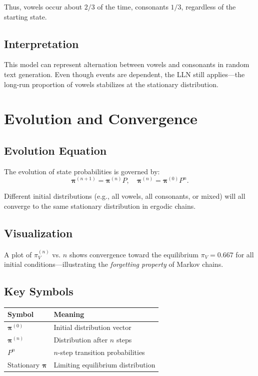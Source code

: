 Thus, vowels occur about $2/3$ of the time, consonants $1/3$, regardless of the starting state.

\subsection*{Interpretation}

This model can represent alternation between vowels and consonants in random text generation.  
Even though events are dependent, the LLN still applies—the long-run proportion of vowels stabilizes at the stationary distribution.


\section{Evolution and Convergence}

\subsection*{Evolution Equation}

The evolution of state probabilities is governed by:
\[
\boldsymbol{\pi}^{(n+1)} = \boldsymbol{\pi}^{(n)} P, \quad
\boldsymbol{\pi}^{(n)} = \boldsymbol{\pi}^{(0)} P^n.
\]

Different initial distributions (e.g., all vowels, all consonants, or mixed) will all converge to the same stationary distribution in ergodic chains.

\subsection*{Visualization}

A plot of $\pi_V^{(n)}$ vs. $n$ shows convergence toward the equilibrium $\pi_V = 0.667$ for all initial conditions—illustrating the \emph{forgetting property} of Markov chains.

\subsection*{Key Symbols}

\begin{center}
\begin{tabular}{ll}
\toprule
\textbf{Symbol} & \textbf{Meaning} \\
\midrule
$\boldsymbol{\pi}^{(0)}$ & Initial distribution vector \\
$\boldsymbol{\pi}^{(n)}$ & Distribution after $n$ steps \\
$P^n$ & $n$-step transition probabilities \\
Stationary $\boldsymbol{\pi}$ & Limiting equilibrium distribution \\
\bottomrule
\end{tabular}
\end{center}

